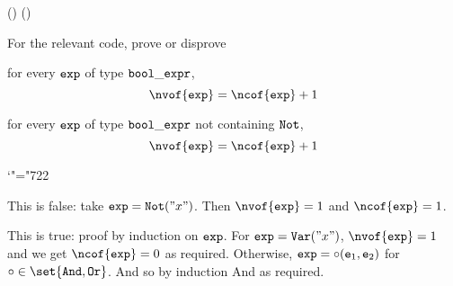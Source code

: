 ({})
({})
\bexerc

    For the relevant code, prove or disprove
    \benum
        \item for every ${\tt exp}$ of type ${\tt bool\_expr}$,
        $$ \nvof{\tt exp} = \ncof{\tt exp} + 1 $$
        \item for every ${\tt exp}$ of type ${\tt bool\_expr}$ not containing ${\tt Not}$,
        $$ \nvof{\tt exp} = \ncof{\tt exp} + 1 $$
    \eenum

\eexerc

\mathcode`"="722

\benum
    \item This is false: take ${\tt exp}={\tt Not}("x")$.
    Then $\nvof{\tt exp}=1$ and $\ncof{\tt exp}=1$.

    \item This is true: proof by induction on ${\tt exp}$.
    For ${\tt exp}={\tt Var}("x")$, $\nvof{\tt exp}=1$ and we get $\ncof{\tt exp}=0$ as required.
    Otherwise, ${\tt exp}=\circ({\tt e}_1,{\tt e}_2)$ for $\circ\in\set{{\tt And},{\tt Or}}$.
    And so by induction
    And
    as required.
\eenum

\bye

